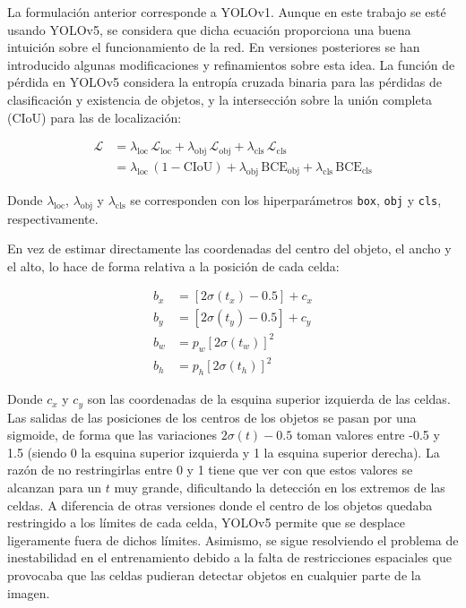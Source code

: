 \documentclass{article}
\begin{document}
	La formulación anterior corresponde a YOLOv1. Aunque en este trabajo se esté usando YOLOv5, se considera que dicha ecuación proporciona una buena intuición sobre el funcionamiento de la red. En versiones posteriores se han introducido algunas modificaciones y refinamientos sobre esta idea. La función de pérdida en YOLOv5 considera la entropía cruzada binaria para las pérdidas de clasificación y existencia de objetos, y la intersección sobre la unión completa (CIoU) para las de localización:

	\begin{equation}
	\begin{aligned}
	\mathcal{L}
	&=
	\lambda_{\text{loc}}\,\mathcal{L}_{\text{loc}}
	+
	\lambda_{\text{obj}}\,\mathcal{L}_{\text{obj}}
	+
	\lambda_{\text{cls}}\,\mathcal{L}_{\text{cls}} \\
	&=
	\lambda_{\text{loc}}\,(1 - \mathrm{CIoU})
	+
	\lambda_{\text{obj}}\,\mathrm{BCE}_{\text{obj}}
	+
	\lambda_{\text{cls}}\,\mathrm{BCE}_{\text{cls}}
	\end{aligned}
	\end{equation}

	Donde $\lambda_{\text{loc}}$, $\lambda_{\text{obj}}$ y $\lambda_{\text{cls}}$ se corresponden con los hiperparámetros \texttt{box}, \texttt{obj} y \texttt{cls}, respectivamente.
	
	En vez de estimar directamente las coordenadas del centro del objeto, el ancho y el alto, lo hace de forma relativa a la posición de cada celda\cite{yolov5}:
	
	\begin{align}
	b_x &= [2\sigma(t_x) - 0.5] + c_x \\
	b_y &= [2\sigma(t_y) - 0.5] + c_y \\
	b_w &= p_w [2 \sigma(t_w)]^2\\
	b_h &= p_h [2 \sigma(t_h)]^2
	\end{align}
	
	Donde $c_x$ y $c_y$ son las coordenadas de la esquina superior izquierda de las celdas. Las salidas de las posiciones de los centros de los objetos se pasan por una sigmoide, de forma que las variaciones $2\sigma(t) - 0.5$ toman valores entre -0.5 y 1.5 (siendo 0 la esquina superior izquierda y 1 la esquina superior derecha). La razón de no restringirlas entre 0 y 1 tiene que ver con que estos valores se alcanzan para un $t$ muy grande, dificultando la detección en los extremos de las celdas. A diferencia de otras versiones donde el centro de los objetos quedaba restringido a los límites de cada celda, YOLOv5 permite que se desplace ligeramente fuera de dichos límites. Asimismo, se sigue resolviendo el problema de inestabilidad en el entrenamiento debido a la falta de restricciones espaciales que provocaba que las celdas pudieran detectar objetos en cualquier parte de la imagen\cite{redmon2016yolo9000betterfasterstronger}. 
	
\end{document}
